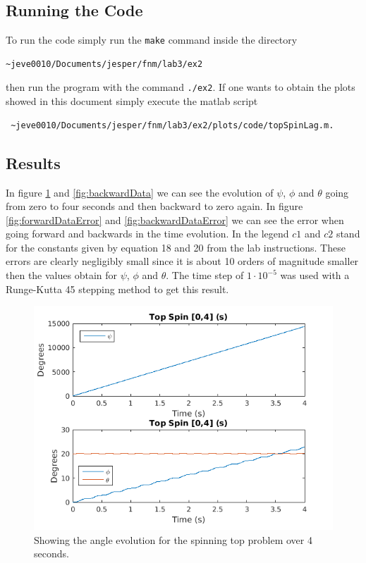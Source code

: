 \documentclass[11pt]{article}
\begin{document}
\subsection{Running the Code}
To run the code simply run the \verb+make+ command inside the directory 
\begin{verbatim}
~jeve0010/Documents/jesper/fnm/lab3/ex2
\end{verbatim}
 then run the program with the command \verb+./ex2+. If one wants to obtain the plots showed in this document simply execute the matlab script 
\begin{verbatim}
 ~jeve0010/Documents/jesper/fnm/lab3/ex2/plots/code/topSpinLag.m.
\end{verbatim}


\subsection{Results}
In figure \ref{fig:forwardData} and \ref{fig:backwardData} we can see the evolution of $\psi$, $\phi$ and $\theta$ going from zero to four seconds and then backward to zero again. In figure \ref{fig:forwardDataError} and \ref{fig:backwardDataError} we can see the error when going forward and backwards in the time evolution. In the legend $c1$ and $c2$ stand for the constants given by equation 18 and 20 from the lab instructions. These errors are clearly negligibly small since it is about 10 orders of magnitude smaller then the values obtain for $\psi$, $\phi$ and $\theta$. The time step of $1\cdot10^{-5}$ was used with a Runge-Kutta 45 stepping method to get this result.

\begin{figure}[H]
	\centering
	\includegraphics[width=1\textwidth]{../ex2/plots/forwardData.png}
	\caption{Showing the angle evolution for the spinning top problem over 4 seconds.}
	\label{fig:forwardData}
\end{figure}
\end{document}
